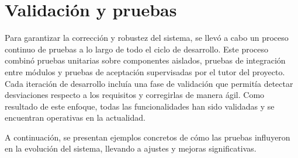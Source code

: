 \section{Validación y pruebas}

Para garantizar la corrección y robustez del sistema, se llevó a cabo un proceso continuo de pruebas a lo largo de todo el ciclo de desarrollo. Este proceso combinó pruebas unitarias sobre componentes aislados, pruebas de integración entre módulos y pruebas de aceptación supervisadas por el tutor del proyecto. Cada iteración de desarrollo incluía una fase de validación que permitía detectar desviaciones respecto a los requisitos y corregirlas de manera ágil. Como resultado de este enfoque, todas las funcionalidades han sido validadas y se encuentran operativas en la actualidad.

A continuación, se presentan ejemplos concretos de cómo las pruebas influyeron en la evolución del sistema, llevando a ajustes y mejoras significativas.

